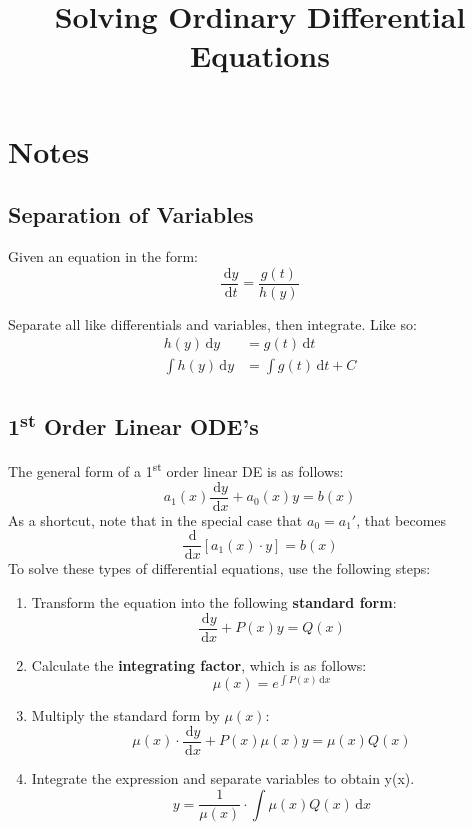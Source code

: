 \documentclass{article}
\title{Solving Ordinary Differential Equations}
\date{}
\author{}
\newcommand{\ud}{\, \mathrm{d}}
\begin{document}
\maketitle
\section{Notes}
	\subsection{Separation of Variables}
		Given an equation in the form:
		\begin{equation}
			\frac{\ud y}{\ud t} = \frac{g(t)}{h(y)}
		\end{equation}
		
		Separate all like differentials and variables, then integrate. Like so:
		\begin{align*}
			h(y)\ud y & = g(t)\ud t \nonumber \\
			\int h(y)\ud y & = \int g(t)\ud t + C \nonumber
		\end{align*}
	\subsection{1\textsuperscript{st} Order Linear ODE's}
		The general form of a 1\textsuperscript{st} order linear DE is as follows:
		\begin{equation}
			a_1(x)\frac{\ud y}{\ud x} + a_0(x)y = b(x)
		\end{equation}
		As a shortcut, note that in the special case that $a_0 = a_1\prime$, that becomes
		\begin{equation*}
			\frac{\ud}{\ud x}[a_1(x) \cdot y] = b(x)
		\end{equation*}
		To solve these types of differential equations, use the following steps:
		\begin{enumerate}
			\item Transform the equation into the following \textbf{standard form}:
				\begin{equation}
					\frac{\ud y}{\ud x} + P(x)y = Q(x)
				\end{equation}
			\item Calculate the \textbf{integrating factor}, which is as follows:
				\begin{equation}
					\mu(x) = e^{\int P(x)\ud x}
				\end{equation}
			\item Multiply the standard form by $\mu(x)$:
				\begin{equation}
					\mu(x) \cdot \frac{\ud y}{\ud x} + P(x)\mu(x)y = \mu(x)Q(x)
				\end{equation}
			\item Integrate the expression and separate variables to obtain y(x).
				\begin{equation}
					y = \frac{1}{\mu(x)} \cdot \int \mu(x)Q(x)\ud x
				\end{equation}
		\end{enumerate}
\end{document}
